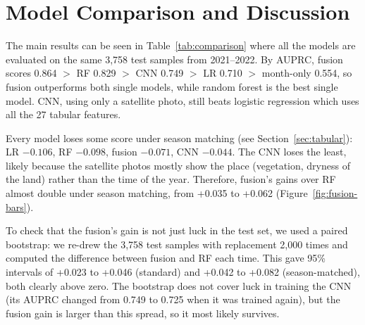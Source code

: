 \section{Model Comparison and Discussion}
\label{sec:comparison}




The main results can be seen in Table~\ref{tab:comparison} where all the models are evaluated on the same 3,758 test samples from 2021--2022. By AUPRC, fusion scores 0.864 $>$ RF 0.829 $>$ CNN 0.749 $>$ LR 0.710 $>$ month-only 0.554, so fusion outperforms both single models, while random forest is the best single model. CNN, using only a satellite photo, still beats logistic regression which uses all the 27 tabular features.

Every model loses some score under season matching (see Section~\ref{sec:tabular}): LR $-0.106$, RF $-0.098$, fusion $-0.071$, CNN $-0.044$. The CNN loses the least, likely because the satellite photos mostly show the place (vegetation, dryness of the land) rather than the time of the year. Therefore, fusion's gains over RF almost double under season matching, from +0.035 to +0.062 (Figure~\ref{fig:fusion-bars}).

To check that the fusion's gain is not just luck in the test set, we used a paired bootstrap: we re-drew the 3,758 test samples with replacement 2,000 times and computed the difference between fusion and RF each time. This gave 95\% intervals of +0.023 to +0.046 (standard) and +0.042 to +0.082 (season-matched), both clearly above zero. The bootstrap does not cover luck in training the CNN (its AUPRC changed from 0.749 to 0.725 when it was trained again), but the fusion gain is larger than this spread, so it most likely survives.

